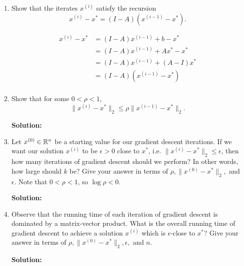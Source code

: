 \documentclass{article}
\newcommand{\solution}{\textbf{Solution: }}
\begin{document}
\begin{enumerate}[label=(\alph*)]
\begin{mdframed}
    \end{mdframed}

  \item Show that the iterates $x^{(i)}$ satisfy the recursion
    $$x^{(i)} - x^* = (I-A)(x^{(i-1)} - x^*).$$
    \begin{mdframed}
      \begin{align*}
        x^{(i)} - x^*
        &= (I - A)x^{(i-1)} + b - x^* \\
        &= (I - A)x^{(i-1)} + Ax^* - x^* \\
        &= (I - A)x^{(i-1)} + (A - I)x^* \\
        &= (I - A)(x^{(i-1)} - x^*) \\
      \end{align*}
    \end{mdframed}

  \item Show that for some $0 < \rho < 1$,
    $$\lVert x^{(i)} - x^* \rVert_2 \leq \rho \lVert x^{(i-1)} - x^*
    \rVert_2.$$
    \begin{mdframed}
    \solution %
    \end{mdframed}

  \item Let $x^{(0)} \in \mathbb{R}^n$ be a starting value for our gradient descent
    iterations. If we want our solution $x^{(i)}$ to be $\epsilon > 0$ close to
    $x^*$, i.e. $\lVert x^{(i)} - x^* \rVert_2 \leq \epsilon$, then how many
    iterations of gradient descent should we perform? In other words, how large
    should $k$ be? Give your answer in terms of
    $\rho, \lVert x^{(0)} - x^*\rVert_2, $ and $\epsilon$. Note that
    $0 < \rho < 1$, so $\log \rho < 0$.
    \begin{mdframed}
    \solution %
    \end{mdframed}

  \item Observe that the running time of each iteration of gradient descent is
    dominated by a matrix-vector product. What is the overall running time of
    gradient descent to achieve a solution $x^{(i)}$ which is $\epsilon$-close
    to $x^*$? Give your answer in terms of
    $\rho, \lVert x^{(0)} - x^*\rVert_2, \epsilon,$ and $n$.
    \begin{mdframed}
    \solution %
    \end{mdframed}
\end{enumerate}

\newpage
\end{document}
